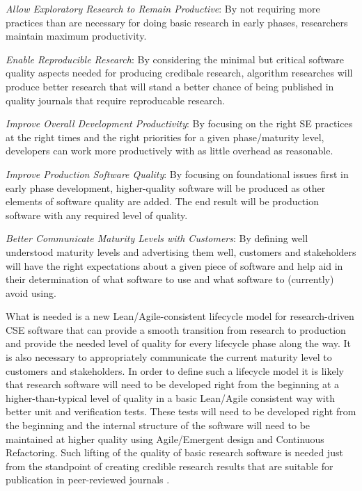 \documentclass[11pt]{SANDreport}
\begin{document}
\begin{compactitem}

{}\item\textit{Allow Exploratory Research to Remain Productive}: By
not requiring more practices than are necessary for doing basic
research in early phases, researchers maintain maximum productivity.

{}\item\textit{Enable Reproducible Research}: By considering the
minimal but critical software quality aspects needed for producing
credibale research, algorithm researches will produce better research
that will stand a better chance of being published in quality journals
that require reproducable research.

{}\item\textit{Improve Overall Development Productivity}: By focusing
on the right SE practices at the right times and the right priorities
for a given phase/maturity level, developers can work more
productively with as little overhead as reasonable.

{}\item\textit{Improve Production Software Quality}: By focusing on
foundational issues first in early phase development, higher-quality
software will be produced as other elements of software quality are
added.  The end result will be production software with any required
level of quality.

{}\item\textit{Better Communicate Maturity Levels with Customers}: By
defining well understood maturity levels and advertising them well,
customers and stakeholders will have the right expectations about a
given piece of software and help aid in their determination of what
software to use and what software to (currently) avoid using.

\end{compactitem}

What is needed is a new Lean/Agile-consistent lifecycle model for
research-driven CSE software that can provide a smooth transition from
research to production and provide the needed level of quality for
every lifecycle phase along the way.  It is also necessary to
appropriately communicate the current maturity level to customers and
stakeholders.  In order to define such a lifecycle model it is likely
that research software will need to be developed right from the
beginning at a higher-than-typical level of quality in a basic
Lean/Agile consistent way with better unit and verification tests.
These tests will need to be developed right from the beginning and the
internal structure of the software will need to be maintained at
higher quality using Agile/Emergent design and Continuous Refactoring.
Such lifting of the quality of basic research software is needed just
from the standpoint of creating credible research results that are
suitable for publication in peer-reviewed journals
{}\cite{CompSciDemandsNewParadigm05,
ScientistsNightmareFiveRetractions2006}.
\end{document}
